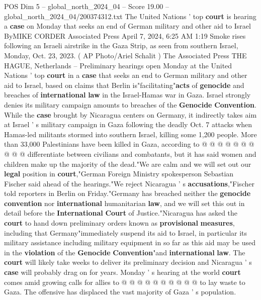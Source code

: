 \begin{textsample}{POS Dim 5 – global\_north\_2024\_04 – Score 19.00 – global\_north\_2024\_04/200374312.txt}  \label{ex:f5_pos_264}
The United Nations ' top \textbf{court} is hearing a \textbf{case} on Monday that seeks an end of German military and other aid to Israel ByMIKE CORDER Associated Press April 7, 2024, 6:25 AM 1:19 Smoke rises following an Israeli airstrike in the Gaza Strip, as seen from southern Israel, Monday, Oct. 23, 2023. ( AP Photo/Ariel Schalit ) The Associated Press THE HAGUE, Netherlands -- Preliminary hearings open Monday at the United Nations ' top \textbf{court} in a \textbf{case} that seeks an end to German military and other aid to Israel, based on claims that Berlin is"facilitating"\textbf{acts} of \textbf{genocide} and breaches of \textbf{international} \textbf{law} in the Israel-Hamas war in Gaza.
Israel strongly denies its military campaign amounts to breaches of the \textbf{Genocide} \textbf{Convention}.
While the \textbf{case} brought by Nicaragua centers on Germany, it indirectly takes aim at Israel ' s military campaign in Gaza following the deadly Oct. 7 attacks when Hamas-led militants stormed into southern Israel, killing some 1,200 people.
More than 33,000 Palestinians have been killed in Gaza, according to @ @ @ @ @ @ @ @ @ @ differentiate between civilians and combatants, but it has said women and children make up the majority of the dead."We are calm and we will set out our \textbf{legal} position in \textbf{court},"German Foreign Ministry spokesperson Sebastian Fischer said ahead of the hearings."We reject Nicaragua ' s \textbf{accusations},"Fischer told reporters in Berlin on Friday."Germany has breached neither the \textbf{genocide} \textbf{convention} nor \textbf{international} humanitarian \textbf{law}, and we will set this out in detail before the \textbf{International} \textbf{Court} of Justice."Nicaragua has asked the \textbf{court} to hand down preliminary orders known as \textbf{provisional} \textbf{measures}, including that Germany"immediately suspend its aid to Israel, in particular its military assistance including military equipment in so far as this aid may be used in the \textbf{violation} of the \textbf{Genocide} \textbf{Convention}"and \textbf{international} \textbf{law}.
The \textbf{court} will likely take weeks to deliver its preliminary decision and Nicaragua ' s \textbf{case} will probably drag on for years.
Monday ' s hearing at the world \textbf{court} comes amid growing calls for allies to @ @ @ @ @ @ @ @ @ @ to lay waste to Gaza.
The offensive has displaced the vast majority of Gaza ' s population.

\end{textsample}
